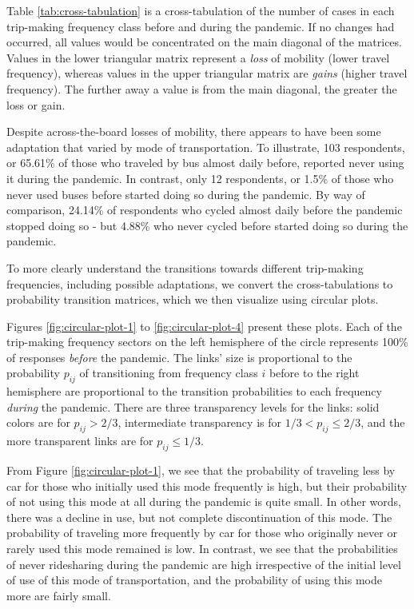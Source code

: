 \documentclass[]{elsarticle} %
\begin{document}
Table \ref{tab:cross-tabulation} is a cross-tabulation of the number of
cases in each trip-making frequency class before and during the
pandemic. If no changes had occurred, all values would be concentrated
on the main diagonal of the matrices. Values in the lower triangular
matrix represent a \emph{loss} of mobility (lower travel frequency),
whereas values in the upper triangular matrix are \emph{gains} (higher
travel frequency). The further away a value is from the main diagonal,
the greater the loss or gain.

Despite across-the-board losses of mobility, there appears to have been
some adaptation that varied by mode of transportation. To illustrate,
103 respondents, or 65.61\% of those who traveled by bus almost daily
before, reported never using it during the pandemic. In contrast, only
12 respondents, or 1.5\% of those who never used buses before started
doing so during the pandemic. By way of comparison, 24.14\% of
respondents who cycled almost daily before the pandemic stopped doing so
- but 4.88\% who never cycled before started doing so during the
pandemic.

To more clearly understand the transitions towards different trip-making
frequencies, including possible adaptations, we convert the
cross-tabulations to probability transition matrices, which we then
visualize using circular plots.

Figures \ref{fig:circular-plot-1} to \ref{fig:circular-plot-4} present
these plots. Each of the trip-making frequency sectors on the left
hemisphere of the circle represents 100\% of responses \emph{before} the
pandemic. The links' size is proportional to the probability \(p_{ij}\)
of transitioning from frequency class \(i\) before to the right
hemisphere are proportional to the transition probabilities to each
frequency \emph{during} the pandemic. There are three transparency
levels for the links: solid colors are for \(p_{ij}>2/3\), intermediate
transparency is for \(1/3 < p_{ij} \le 2/3\), and the more transparent
links are for \(p_{ij}\le 1/3\).

From Figure \ref{fig:circular-plot-1}, we see that the probability of
traveling less by car for those who initially used this mode frequently
is high, but their probability of not using this mode at all during the
pandemic is quite small. In other words, there was a decline in use, but
not complete discontinuation of this mode. The probability of traveling
more frequently by car for those who originally never or rarely used
this mode remained is low. In contrast, we see that the probabilities of
never ridesharing during the pandemic are high irrespective of the
initial level of use of this mode of transportation, and the probability
of using this mode more are fairly small.
\end{document}
